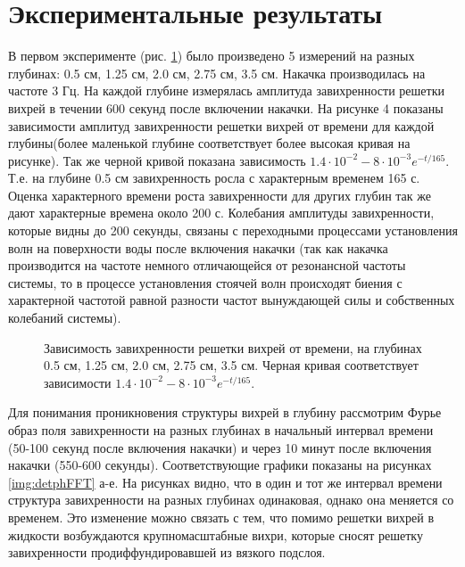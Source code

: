 \section{Экспериментальные результаты} \label{sect6_3}

В первом эксперименте (рис. \ref{img:5deeps}) было произведено 5 измерений на разных глубинах: 0.5 см, 1.25 см, 2.0 см, 2.75 см, 3.5 см. Накачка производилась на частоте 3 Гц. На каждой глубине измерялась амплитуда завихренности решетки вихрей в течении 600 секунд после включении накачки. На рисунке 4 показаны зависимости амплитуд завихренности решетки вихрей от времени для каждой глубины(более маленькой глубине соответствует более высокая кривая на рисунке). Так же черной кривой показана зависимость $1.4 \cdot 10^{-2} - 8 \cdot 10^{-3} e^{-t/165}$. Т.е. на глубине 0.5 см завихренность росла с характерным временем 165 с. Оценка характерного времени роста завихренности для других глубин так же дают характерные времена около 200 с. Колебания амплитуды завихренности, которые видны до 200 секунды, связаны с переходными процессами установления волн на поверхности воды после включения накачки (так как накачка производится на частоте немного отличающейся от резонансной частоты системы, то в процессе установления стоячей волн происходят биения с характерной частотой равной разности частот вынуждающей силы и собственных колебаний системы).

\begin{figure}[ht]
  \caption{Зависимость завихренности решетки вихрей от времени, на глубинах 0.5 см, 1.25 см, 2.0 см, 2.75 см, 3.5 см. Черная кривая соответствует зависимости $1.4 \cdot 10^{-2} - 8 \cdot 10^{-3} e^{-t/165}$.}
  \label{img:5deeps}  
\end{figure}


Для понимания проникновения структуры вихрей в глубину рассмотрим Фурье образ поля завихренности на разных глубинах в начальный интервал времени (50-100 секунд после включения накачки) и через 10 минут после включения накачки (550-600 секунды). Соответствующие графики показаны на рисунках \ref{img:detphFFT} а-е. На рисунках видно, что в один и тот же интервал времени структура завихренности на разных глубинах одинаковая, однако она меняется со временем. Это изменение можно связать с тем, что помимо решетки вихрей в жидкости возбуждаются крупномасштабные вихри, которые сносят  решетку завихренности продиффундировавшей из вязкого подслоя.

